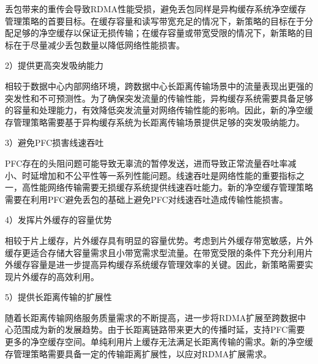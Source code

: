丢包带来的重传会导致RDMA性能受损，避免丢包同样是异构缓存系统净空缓存管理策略的首要目标。在缓存容量和读写带宽充足的情况下，新策略的目标在于分配足够的净空缓存以保证无损传输；在缓存容量或带宽受限的情况下，新策略的目标在于尽量减少丢包数量以降低网络性能损害。

2）提供更高突发吸纳能力

相较于数据中心内部网络环境，跨数据中心长距离传输场景中的流量表现出更强的突发性和不可预测性。为了确保突发流量的传输性能，异构缓存系统需要具备足够的容量和处理能力，有效降低突发流量对网络传输性能的影响。因此，新的净空缓存管理策略需要基于异构缓存系统为长距离传输场景提供足够的突发吸纳能力。

3）避免PFC损害线速吞吐

PFC存在的头阻问题可能导致无辜流的暂停发送，进而导致正常流量吞吐率减小、时延增加和不公平性等一系列性能问题。线速吞吐是网络性能的重要指标之一，高性能网络传输需要无损缓存系统提供线速吞吐能力。新的净空缓存管理策略需要在利用PFC避免丢包的基础上避免PFC对线速吞吐造成传输性能损害。

4）发挥片外缓存的容量优势

相较于片上缓存，片外缓存具有明显的容量优势。考虑到片外缓存带宽敏感，片外缓存更适合存储大容量需求且小带宽需求型流量。在带宽受限的条件下充分利用片外缓存容量是进一步提高异构缓存系统缓存管理效率的关键。因此，新策略需要实现片外缓存的高效利用。

5）提供长距离传输的扩展性

随着长距离传输网络服务质量需求的不断提高，进一步将RDMA扩展至跨数据中心范围成为新的发展趋势。由于长距离链路带来更大的传播时延，支持PFC需要更多的净空缓存空间。单纯利用片上缓存无法满足长距离传输的需求。新的净空缓存管理策略需要具备一定的传输距离扩展性，以应对RDMA扩展需求。


\label{c4:s3:ss2:key ideas}

